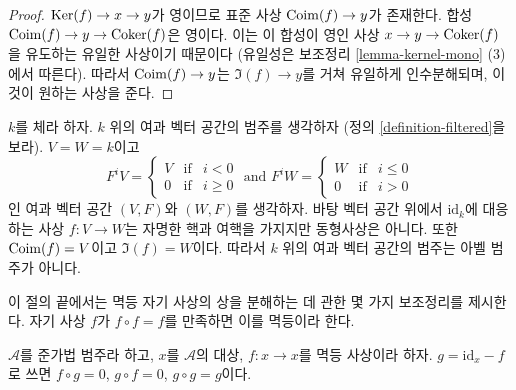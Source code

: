 \begin{proof}
$\mathop{\mathrm{Ker}}(f) \to x \to y$가 영이므로 표준 사상 $\mathop{\mathrm{Coim}}(f) \to y$가 존재한다.
합성 $\mathop{\mathrm{Coim}}(f) \to y \to \mathop{\mathrm{Coker}}(f)$은 영이다. 이는 이 합성이
영인 사상 $x \to y \to \mathop{\mathrm{Coker}}(f)$을 유도하는 유일한 사상이기 때문이다
(유일성은 보조정리 \ref{lemma-kernel-mono} (3)에서 따른다).
따라서 $\mathop{\mathrm{Coim}}(f) \to y$는 $\Im(f) \to y$를 거쳐 유일하게
인수분해되며, 이것이 원하는 사상을 준다.
\end{proof}

\begin{example}
\label{example-not-abelian}
$k$를 체라 하자. $k$ 위의 여과 벡터 공간의 범주를 생각하자
(정의 \ref{definition-filtered}을 보라).
$V = W = k$이고
$$
F^iV
=
\left\{
\begin{matrix}
V & \text{if} & i < 0 \\
0 & \text{if} & i \geq 0
\end{matrix}
\right.
\text{ and }
F^iW
=
\left\{
\begin{matrix}
W & \text{if} & i \leq 0 \\
0 & \text{if} & i > 0
\end{matrix}
\right.
$$
인 여과 벡터 공간 $(V, F)$와 $(W, F)$를 생각하자.
바탕 벡터 공간 위에서 $\text{id}_k$에 대응하는 사상 $f : V \to W$는
자명한 핵과 여핵을 가지지만 동형사상은 아니다. 또한
$\mathop{\mathrm{Coim}}(f) = V$이고 $\Im(f) = W$이다. 따라서 $k$ 위의 여과 벡터 공간의
범주는 아벨 범주가 아니다.
\end{example}

\noindent
이 절의 끝에서는 멱등 자기 사상의 상을 분해하는 데 관한 몇 가지
보조정리를 제시한다. 자기 사상 $f$가 $f \circ f = f$를 만족하면
이를 멱등이라 한다.

\begin{remark}
\label{remark-idempotent-symmetry}
$\mathcal{A}$를 준가법 범주라 하고, $x$를 $\mathcal{A}$의 대상,
$f : x \to x$를 멱등 사상이라 하자. $g = \text{id} _ x - f$로 쓰면
$f \circ g = 0$, $g \circ f = 0$, $g \circ g = g$이다.
\end{remark}

